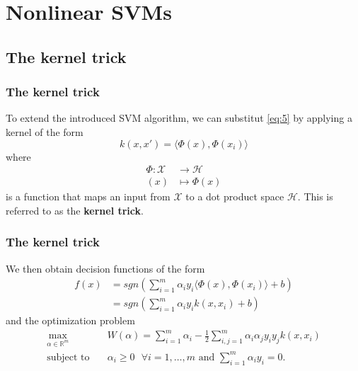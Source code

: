 \documentclass{beamer}
\begin{document}
\section{Nonlinear SVMs}

\subsection{The kernel trick}

\begin{frame}{}
	\frametitle{The kernel trick}
	To extend the introduced SVM algorithm, we can substitut \eqref{eq:5} by applying a kernel of the form
    \begin{equation}
        k(x,x') = \langle \Phi (x), \Phi (x_i) \rangle
    \end{equation}
    where 
    \begin{equation}
        \begin{aligned}
            \Phi: \mathcal{X} & \rightarrow \mathcal{H} \\
            (x) & \mapsto \Phi (x)
        \end{aligned}
    \end{equation}
    is a function that maps an input from $ \mathcal{X} $ to a dot product space $ \mathcal{H} $. This is referred to as the \textbf{kernel trick}.
\end{frame}


\begin{frame}{}
	\frametitle{The kernel trick}
	We then obtain decision functions of the form
    \begin{align}
        f(x) & = sgn \left( \sum_{i=1}^{m} \alpha_i y_i \langle \Phi (x), \Phi (x_i) \rangle + b \right) \\ 
        & = sgn \left( \sum_{i=1}^{m} \alpha_i y_i k(x,x_i) + b \right)
    \end{align}
    and the optimization problem
    \begin{equation} \label{eq:6}
        \begin{aligned}
            \max_{\alpha \in \mathbb{R}^m} \quad & W(\alpha) = \sum_{i=1}^{m} \alpha_i - \frac{1}{2} \sum_{i,j=1}^{m} \alpha_i \alpha_j y_i y_j k(x, x_i) \\
            \textrm{subject to} \quad & \alpha_i \geq 0 \text{ } \forall i = {1, \dots, m} \text{ and } \sum_{i=1}^{m} \alpha_i y_i = 0. 
        \end{aligned}
    \end{equation}
\end{frame}
\end{document}
